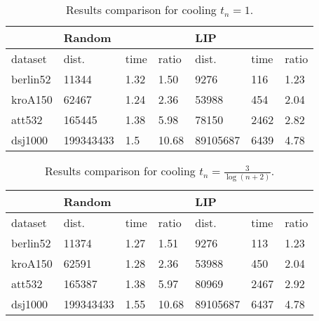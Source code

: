 \begin{table}[!htb]
	\centering
	\begin{tabular}{l|lll|lll|}
		\cline{2-7}
		& \multicolumn{3}{l|}{Random}                                        & \multicolumn{3}{l|}{LIP}                                          \\ \hline
		\multicolumn{1}{|l|}{dataset}  & \multicolumn{1}{l|}{dist.}     & \multicolumn{1}{l|}{time} & ratio & \multicolumn{1}{l|}{dist.}    & \multicolumn{1}{l|}{time} & ratio \\ \hline
		\multicolumn{1}{|l|}{berlin52} & \multicolumn{1}{l|}{11344}     & \multicolumn{1}{l|}{1.32} & 1.50  & \multicolumn{1}{l|}{9276}     & \multicolumn{1}{l|}{116}  & 1.23  \\ \hline
		\multicolumn{1}{|l|}{kroA150}  & \multicolumn{1}{l|}{62467}     & \multicolumn{1}{l|}{1.24} & 2.36  & \multicolumn{1}{l|}{53988}    & \multicolumn{1}{l|}{454}  & 2.04  \\ \hline
		\multicolumn{1}{|l|}{att532}   & \multicolumn{1}{l|}{165445}    & \multicolumn{1}{l|}{1.38} & 5.98  & \multicolumn{1}{l|}{78150}    & \multicolumn{1}{l|}{2462} & 2.82  \\ \hline
		\multicolumn{1}{|l|}{dsj1000}  & \multicolumn{1}{l|}{199343433} & \multicolumn{1}{l|}{1.5}  & 10.68 & \multicolumn{1}{l|}{89105687} & \multicolumn{1}{l|}{6439} & 4.78  \\ \hline
	\end{tabular}
	\caption{Results comparison for cooling $t_n=1$.}
	\label{tab:results_comp_cool=1}
\end{table}

\begin{table}[!htb]
	\centering
	\begin{tabular}{l|lll|lll|}
		\cline{2-7}
		& \multicolumn{3}{l|}{Random}                                        & \multicolumn{3}{l|}{LIP}                                          \\ \hline
		\multicolumn{1}{|l|}{dataset}  & \multicolumn{1}{l|}{dist.}     & \multicolumn{1}{l|}{time} & ratio & \multicolumn{1}{l|}{dist.}    & \multicolumn{1}{l|}{time} & ratio \\ \hline
		\multicolumn{1}{|l|}{berlin52} & \multicolumn{1}{l|}{11374}     & \multicolumn{1}{l|}{1.27} & 1.51  & \multicolumn{1}{l|}{9276}     & \multicolumn{1}{l|}{113}  & 1.23  \\ \hline
		\multicolumn{1}{|l|}{kroA150}  & \multicolumn{1}{l|}{62591}     & \multicolumn{1}{l|}{1.28} & 2.36  & \multicolumn{1}{l|}{53988}    & \multicolumn{1}{l|}{450}  & 2.04  \\ \hline
		\multicolumn{1}{|l|}{att532}   & \multicolumn{1}{l|}{165387}    & \multicolumn{1}{l|}{1.38} & 5.97  & \multicolumn{1}{l|}{80969}    & \multicolumn{1}{l|}{2467} & 2.92  \\ \hline
		\multicolumn{1}{|l|}{dsj1000}  & \multicolumn{1}{l|}{199343433} & \multicolumn{1}{l|}{1.55} & 10.68 & \multicolumn{1}{l|}{89105687} & \multicolumn{1}{l|}{6437} & 4.78  \\ \hline
	\end{tabular}
	\caption{Results comparison for cooling $t_n=\frac{3}{\log(n+2)}$.}
	\label{tab:results_comp_cool=2.73}
\end{table}